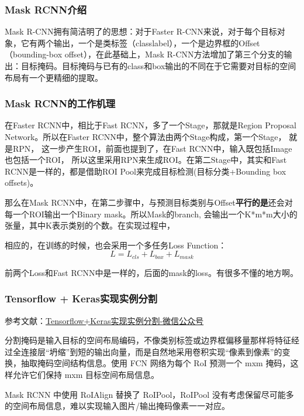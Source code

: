 \subsubsection{Mask RCNN介绍}
Mask R-CNN拥有简洁明了的思想：对于Faster R-CNN来说，对于每个目标对象，它有两个输出，一个是类标签（classlabel），一个是边界框的Offset（bounding-box offset），在此基础上，Mask R-CNN方法增加了第三个分支的输出：目标掩码。目标掩码与已有的class和box输出的不同在于它需要对目标的空间布局有一个更精细的提取。

\subsubsection{Mask RCNN的工作机理}

在Faster RCNN中，相比于Fast RCNN，多了一个Stage，那就是Region Proposal Network。所以在Faster RCNN中，整个算法由两个Stage构成，第一个Stage， 就是RPN， 这一步产生ROI，前面也提到了，在Fast RCNN中，输入既包括Image也包括一个ROI， 所以这里采用RPN来生成ROI。在第二Stage中，其实和Fast RCNN是一样的，都是借助ROI Pool来完成目标检测(目标分类+Bounding box offsets)。

那么在Mask RCNN中，在第二步骤中，与预测目标类别与Offset\textbf{平行的是}还会对每一个ROI输出一个Binary mask。所以Mask的branch, 会输出一个K*m*m大小的张量，其中K表示类别的个数。在实现过程中，

相应的，在训练的时候，也会采用一个多任务Loss Function：
\begin{displaymath}
L = L_{cls} + L_{box} + L_{mask}
\end{displaymath}

前两个Loss和Fast RCNN中是一样的，后面的mask的loss。有很多不懂的地方啊。

\subsubsection{Tensorflow + Keras实现实例分割}

参考文献：\href{https://mp.weixin.qq.com/s/Fo1yd6W1EdCQGEflP26tHA}{Tensorflow+Keras实现实例分割-微信公众号}

分割掩码是输入目标的空间布局编码，不像类别标签或边界框偏移量那样将特征经过全连接层“坍缩”到短的输出向量，而是自然地采用卷积实现“像素到像素”的变换，抽取掩码空间结构信息。使用 FCN 网络为每个 RoI 预测一个 mxm 掩码，这样允许它们保持 mxm 目标空间布局信息。

Mask RCNN 中使用 RoIAlign 替换了 RoIPool，RoIPool 没有考虑保留尽可能多的空间布局信息，难以实现输入图片/输出掩码像素一一对应。



























